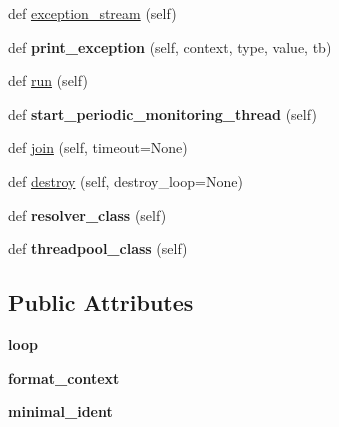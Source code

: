 \begin{DoxyCompactItemize}
def \hyperlink{classgevent_1_1hub_1_1_hub_a6dc448d76b7697b10aaba0f789872b15}{exception\+\_\+stream} (self)
\item 
\mbox{\label{classgevent_1_1hub_1_1_hub_acb1e6ee604d2e2fbbfe1be73894212fb}} 
def {\bfseries print\+\_\+exception} (self, context, type, value, tb)
\item 
def \hyperlink{classgevent_1_1hub_1_1_hub_a643e6fb069d194a10c8b31bff92d7563}{run} (self)
\item 
\mbox{\label{classgevent_1_1hub_1_1_hub_aebd5d8fe3bc6df7c84af9d675ad405b0}} 
def {\bfseries start\+\_\+periodic\+\_\+monitoring\+\_\+thread} (self)
\item 
def \hyperlink{classgevent_1_1hub_1_1_hub_a56429a4dd8bdc99bda65aeeba20aeba9}{join} (self, timeout=None)
\item 
def \hyperlink{classgevent_1_1hub_1_1_hub_a878ff1369af9d48f9fd3e4b89e18c550}{destroy} (self, destroy\+\_\+loop=None)
\item 
\mbox{\label{classgevent_1_1hub_1_1_hub_af2ca3f7b080398fd42b235c969238f70}} 
def {\bfseries resolver\+\_\+class} (self)
\item 
\mbox{\label{classgevent_1_1hub_1_1_hub_a9e6536bb37dc3588374a26c88964cb53}} 
def {\bfseries threadpool\+\_\+class} (self)
\end{DoxyCompactItemize}
\subsection*{Public Attributes}
\begin{DoxyCompactItemize}
\item 
\mbox{\label{classgevent_1_1hub_1_1_hub_a331e728fd0e5dc2aa6d9dc8c82bf3667}} 
{\bfseries loop}
\item 
\mbox{\label{classgevent_1_1hub_1_1_hub_a80739c6d0b683c1e3456331aa69ef142}} 
{\bfseries format\+\_\+context}
\item 
\mbox{\label{classgevent_1_1hub_1_1_hub_acfc627cda9811c9a4c8a6cbb545dbbaf}} 
{\bfseries minimal\+\_\+ident}
\end{DoxyCompactItemize}

